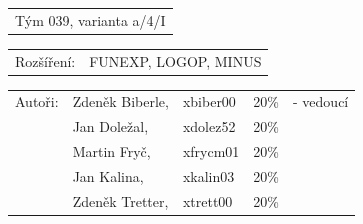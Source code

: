 \begin{titlepage}
\begin{flushleft}
\begin{large}
\begin{tabular}{l}
Tým 039, varianta a/4/I
\end{tabular}
\newline
\begin{tabular}{ll}
Rozšíření: & FUNEXP, LOGOP, MINUS
\end{tabular}
\newline
\newline
\begin{tabular}{lllll}
Autoři: & Zdeněk Biberle, & xbiber00 & 20\% & - vedoucí \\
        & Jan Doležal,    & xdolez52 & 20\% & \\
        & Martin Fryč,    & xfrycm01 & 20\% & \\
        & Jan Kalina,     & xkalin03 & 20\% & \\
        & Zdeněk Tretter, & xtrett00 & 20\% & \\
\end{tabular}
\end{large}
\end{flushleft}
\end{titlepage}
